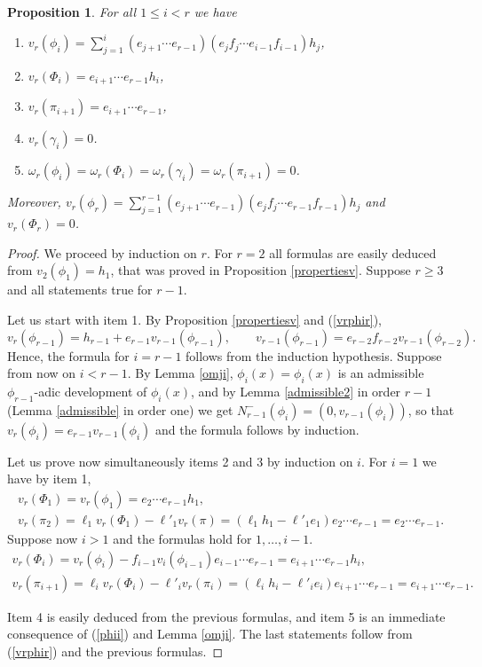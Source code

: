 \documentclass{amsart}
\newtheorem{proposition}[theorem]{Proposition}
\def\as#1{\renewcommand\arraystretch{#1}}
\def\ga{\gamma}
\def\om{\omega}
\begin{document}
\begin{proposition}\label{vrphii}
For all $1\le i<r$ we have
\begin{enumerate}
 \item $v_r(\phi_i)=\sum_{j=1}^i\left(e_{j+1}\cdots e_{r-1}\right)\left(e_jf_j\cdots e_{i-1}f_{i-1}\right)h_j$,
\item  $v_r(\Phi_i)=e_{i+1}\cdots e_{r-1}h_i$,
\item $v_r(\pi_{i+1})=e_{i+1}\cdots e_{r-1}$,
\item $v_r(\ga_i)=0$.
\item $\om_{r}(\phi_i)=\om_{r}(\Phi_i)=\om_{r}(\ga_i)=\om_{r}(\pi_{i+1})=0$.
\end{enumerate}
Moreover, $v_r(\phi_r)=\sum_{j=1}^{r-1}\left(e_{j+1}\cdots e_{r-1}\right)\left(e_jf_j\cdots e_{r-1}f_{r-1}\right)h_j$ and $v_r(\Phi_r)=0$.
\end{proposition}

\begin{proof}
We proceed by induction on $r$. For $r=2$ all formulas are easily deduced from $v_2(\phi_1)=h_1$, that was proved in Proposition \ref{propertiesv}. Suppose $r\ge 3$ and all statements true for $r-1$. 

Let us start with item 1. By Proposition \ref{propertiesv} and (\ref{vrphir}),  $$v_r(\phi_{r-1})=h_{r-1}+e_{r-1}v_{r-1}(\phi_{r-1}), \qquad v_{r-1}(\phi_{r-1})=e_{r-2}f_{r-2}v_{r-1}(\phi_{r-2}).$$ Hence, the formula for $i=r-1$ follows from the induction hypothesis. Suppose from now on $i<r-1$. By Lemma \ref{omji}, $\phi_i(x)=\phi_i(x)$ is an admissible $\phi_{r-1}$-adic development of $\phi_i(x)$, and by Lemma \ref{admissible2} in order $r-1$ (Lemma \ref{admissible} in order one) we get $N_{r-1}^-(\phi_i)=(0,v_{r-1}(\phi_i))$, so that 
$v_r(\phi_i)=e_{r-1} v_{r-1}(\phi_i)$ and the formula follows by induction. 

Let us prove now simultaneously items 2 and 3 by induction on $i$. For $i=1$ we have  by item 1, 
$$\as{1.2}
\begin{array}{l}
v_r(\Phi_1)=v_r(\phi_1)=e_2\cdots e_{r-1}h_1,\\
v_r(\pi_2)=\ell_1v_r(\Phi_1)-\ell'_1v_r(\pi)=(\ell_1h_1-\ell'_1e_1)e_2\cdots e_{r-1}=e_2\cdots e_{r-1}.
\end{array}
$$
Suppose now $i>1$ and the formulas hold for $1,\dots,i-1$. 
$$\as{1.2}
\begin{array}{l}
v_r(\Phi_i)=v_r(\phi_i)-f_{i-1}v_i(\phi_{i-1})e_{i-1}\cdots e_{r-1}=e_{i+1}\cdots e_{r-1}h_i,\\
v_r(\pi_{i+1})=\ell_i v_r(\Phi_i)-\ell'_iv_r(\pi_i)=(\ell_ih_i-\ell'_ie_i)e_{i+1}\cdots e_{r-1}=e_{i+1}\cdots e_{r-1}.
\end{array}
$$     

Item 4 is easily deduced from the previous formulas, and item 5 is an immediate consequence of (\ref{phii}) and Lemma \ref{omji}. The last statements follow from (\ref{vrphir}) and the previous formulas.
\end{proof}
\end{document}
